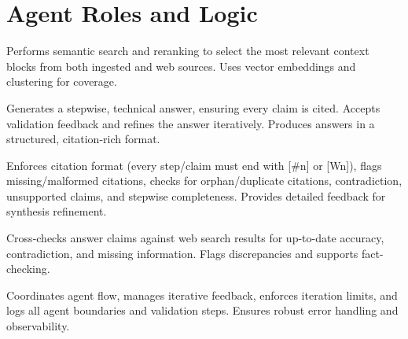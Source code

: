\documentclass{article}
\begin{document}
\section*{Agent Roles and Logic}
\begin{description}[leftmargin=!, labelwidth=3.5cm, itemsep=0.5em]
  \item[Retrieval Agent] Performs semantic search and reranking to select the most relevant context blocks from both ingested and web sources. Uses vector embeddings and clustering for coverage.
  \item[Synthesis Agent] Generates a stepwise, technical answer, ensuring every claim is cited. Accepts validation feedback and refines the answer iteratively. Produces answers in a structured, citation-rich format.
  \item[Validation Agent] Enforces citation format (every step/claim must end with [\#n] or [Wn]), flags missing/malformed citations, checks for orphan/duplicate citations, contradiction, unsupported claims, and stepwise completeness. Provides detailed feedback for synthesis refinement.
  \item[Web Validation Agent] Cross-checks answer claims against web search results for up-to-date accuracy, contradiction, and missing information. Flags discrepancies and supports fact-checking.
  \item[Orchestrator] Coordinates agent flow, manages iterative feedback, enforces iteration limits, and logs all agent boundaries and validation steps. Ensures robust error handling and observability.
\end{description}
\end{document}

